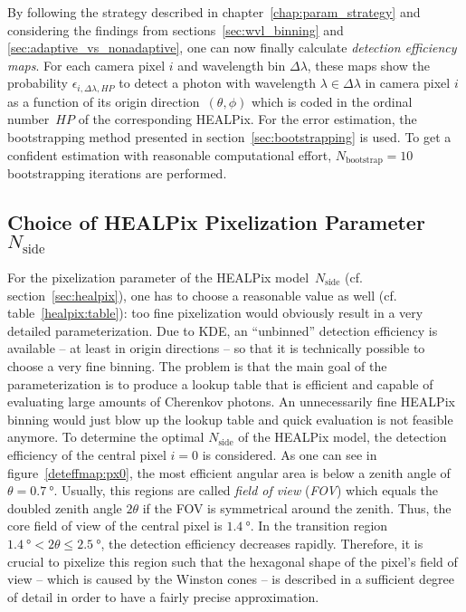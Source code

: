 By following the strategy described in chapter~\ref{chap:param_strategy} and considering the findings from sections~\ref{sec:wvl_binning} and \ref{sec:adaptive_vs_nonadaptive}, one can now finally calculate \textit{detection efficiency maps}. For each camera pixel $i$ and wavelength bin $\Delta\lambda$, these maps show the probability $\epsilon_{i,\Delta\lambda,HP}$ to detect a photon with wavelength $\lambda\in\Delta\lambda$ in camera pixel $i$ as a function of its origin direction~$(\theta,\phi)$ which is coded in the ordinal number~$HP$ of the corresponding HEALPix. For the error estimation, the bootstrapping method presented in section~\ref{sec:bootstrapping} is used. To get a confident estimation with reasonable computational effort, $N_\text{bootstrap} = \num{10}$ bootstrapping iterations are performed.\\

\subsection{Choice of HEALPix Pixelization Parameter $N_\text{side}$}

For the pixelization parameter of the HEALPix model~$N_\text{side}$ (cf. section~\ref{sec:healpix}), one has to choose a reasonable value as well (cf. table~\ref{healpix:table}): too fine pixelization would obviously result in a very detailed parameterization. Due to KDE, an \enquote{unbinned} detection efficiency is available -- at least in origin directions -- so that it is technically possible to choose a very fine binning. The problem is that the main goal of the \iceact parameterization is to produce a lookup table that is efficient and capable of evaluating large amounts of Cherenkov photons. An unnecessarily fine HEALPix binning would just blow up the lookup table and quick evaluation is not feasible anymore. To determine the optimal $N_\text{side}$ of the HEALPix model, the detection efficiency of the central pixel $i=0$ is considered. As one can see in figure~\ref{deteffmap:px0}, the most efficient angular area is below a zenith angle of $\theta=\SI{0.7}{\degree}$. Usually, this regions are called \textit{field of view} (\textit{FOV}) which equals the doubled zenith angle $2\theta$ if the FOV is symmetrical around the zenith. Thus, the core field of view of the central pixel is $\SI{1.4}{\degree}$. In the transition region $\SI{1.4}{\degree} < 2\theta \leq \SI{2.5}{\degree}$, the detection efficiency decreases rapidly. Therefore, it is crucial to pixelize this region such that the hexagonal shape of the pixel's field of view -- which is caused by the Winston cones -- is described in a sufficient degree of detail in order to have a fairly precise approximation.

